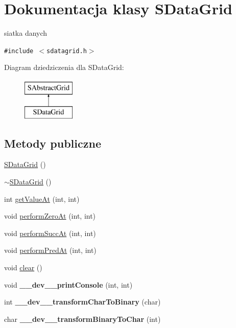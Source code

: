 \hypertarget{classSDataGrid}{
\section{Dokumentacja klasy SDataGrid}
\label{classSDataGrid}
}
siatka danych  


{\tt \#include $<$sdatagrid.h$>$}

Diagram dziedziczenia dla SDataGrid:\begin{figure}[H]
\begin{center}
\leavevmode
\includegraphics[height=2cm]{classSDataGrid}
\end{center}
\end{figure}
\subsection*{Metody publiczne}
\begin{CompactItemize}
\item 
\hyperlink{classSDataGrid_741ea12ba0eec8c00fec30c8730f2192}{SDataGrid} ()
\item 
\hyperlink{classSDataGrid_51645b217b4c668e0e945cdbda1db3ec}{$\sim$SDataGrid} ()
\item 
int \hyperlink{classSDataGrid_7f9dd63d74e36731875630a96ea8dd07}{getValueAt} (int, int)
\item 
void \hyperlink{classSDataGrid_bd825a6b1f64a7410c7c5f2a94af8fb9}{performZeroAt} (int, int)
\item 
void \hyperlink{classSDataGrid_33bf85628d27e5d467d4aff0b67ccd79}{performSuccAt} (int, int)
\item 
void \hyperlink{classSDataGrid_7085f1322b3ad39fcbaa9ca13ca79866}{performPredAt} (int, int)
\item 
void \hyperlink{classSDataGrid_80b67d2da29f99384fb2852828d83b91}{clear} ()
\item 
\hypertarget{classSDataGrid_8b94af72ddf880b0297baf24ceb2395a}{
void \textbf{\_\-\_\-dev\_\-\_\-printConsole} (int, int)}
\label{classSDataGrid_8b94af72ddf880b0297baf24ceb2395a}

\item 
\hypertarget{classSDataGrid_8421b3a44bfa7f38fd99cd9b5338ecc1}{
int \textbf{\_\-\_\-dev\_\-\_\-transformCharToBinary} (char)}
\label{classSDataGrid_8421b3a44bfa7f38fd99cd9b5338ecc1}

\item 
\hypertarget{classSDataGrid_8b1d40667ed06f454071faeaaa802b66}{
char \textbf{\_\-\_\-dev\_\-\_\-transformBinaryToChar} (int)}
\label{classSDataGrid_8b1d40667ed06f454071faeaaa802b66}

\end{CompactItemize}
